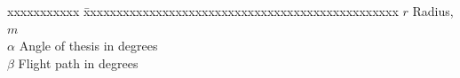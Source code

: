 \documentclass[BTech]{iitmdiss}
\begin{document}
\begin{singlespace}
\begin{tabbing}
xxxxxxxxxxx \= xxxxxxxxxxxxxxxxxxxxxxxxxxxxxxxxxxxxxxxxxxxxxxxx \kill
\textbf{$r$}  \> Radius, $m$ \\
\textbf{$\alpha$}  \> Angle of thesis in degrees \\
\textbf{$\beta$}   \> Flight path in degrees \\
\end{tabbing}
\end{singlespace}

\pagebreak
\clearpage



\end{document}
